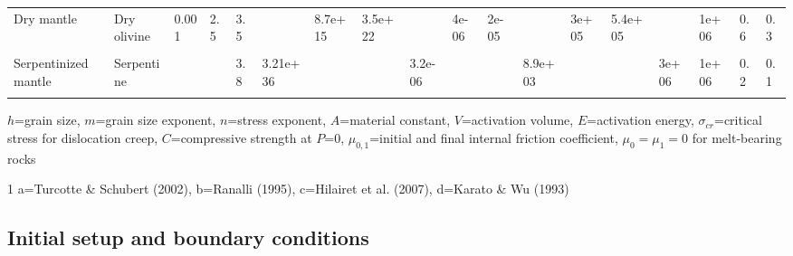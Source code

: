 \documentclass[draft,linenumbers]{agujournal2018}
\begin{document}
\begin{landscape}
\begin{table}
{\begin{threeparttable}
\begin{tabular}[t]{llllllllllllllllll}
Dry mantle & Dry olivine & 0.001 & 2.5 & 3.5 &  & 8.7e+15 & 3.5e+22 &  & 4e-06 & 2e-05 &  & 3e+05 & 5.4e+05 &  & 1e+06 & 0.6 & 0.3\\
\cellcolor{gray!6}{Hydrated mantle} & \cellcolor{gray!6}{Wet olivine} & \cellcolor{gray!6}{0.001} & \cellcolor{gray!6}{2.5} & \cellcolor{gray!6}{3} & \cellcolor{gray!6}{} & \cellcolor{gray!6}{5.3e+15} & \cellcolor{gray!6}{2e+18} & \cellcolor{gray!6}{} & \cellcolor{gray!6}{4e-06} & \cellcolor{gray!6}{1e-05} & \cellcolor{gray!6}{} & \cellcolor{gray!6}{2.4e+05} & \cellcolor{gray!6}{4.3e+05} & \cellcolor{gray!6}{} & \cellcolor{gray!6}{1e+06} & \cellcolor{gray!6}{0.6} & \cellcolor{gray!6}{0.3}\\
\addlinespace
Serpentinized mantle & Serpentine &  &  & 3.8 & 3.21e+36 &  &  & 3.2e-06 &  &  & 8.9e+03 &  &  & 3e+06 & 1e+06 & 0.2 & 0.1\\
\midrule
\cellcolor{gray!6}{Reference$^1$} & \cellcolor{gray!6}{b, c, d} & \cellcolor{gray!6}{d} & \cellcolor{gray!6}{d} & \cellcolor{gray!6}{b, c, d} & \cellcolor{gray!6}{b, c} & \cellcolor{gray!6}{d} & \cellcolor{gray!6}{d} & \cellcolor{gray!6}{b, c} & \cellcolor{gray!6}{d} & \cellcolor{gray!6}{d} & \cellcolor{gray!6}{b, c} & \cellcolor{gray!6}{d} & \cellcolor{gray!6}{d} & \cellcolor{gray!6}{b, c} & \cellcolor{gray!6}{a} & \cellcolor{gray!6}{} & \cellcolor{gray!6}{}\\
\bottomrule
\end{tabular}
\begin{tablenotes}
\item $h$=grain size, $m$=grain size exponent, $n$=stress exponent, $A$=material constant, $V$=activation volume, $E$=activation energy, $\sigma_{cr}$=critical stress for dislocation creep, $C$=compressive strength at $P$=0, $\mu_{0,1}$=initial and final internal friction coefficient, $\mu_0=\mu_1=0$ for melt-bearing rocks
\item[1] a=Turcotte \& Schubert (2002), b=Ranalli (1995), c=Hilairet et al. (2007), d=Karato \& Wu (1993)
\end{tablenotes}
\end{threeparttable}}
\end{table}
\end{landscape}

\subsection{Initial setup and boundary conditions}
\end{document}
